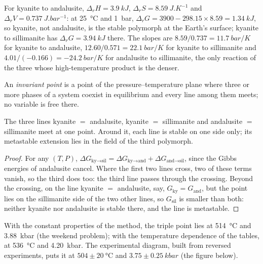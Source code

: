 For kyanite to andalusite, $\Delta_r H = \qty{3.9}{kJ}$, $\Delta_r S =
\qty{8.59}{J.K^{-1}}$ and $\Delta_r V = \qty{0.737}{J.bar^{-1}}$: at \qty{25}{\celsius}
and \qty{1}{bar}, $\Delta_r G = 3900 - 298.15\times8.59 = \qty{+1.34}{kJ}$, so kyanite,
not andalusite, is the stable polymorph at the Earth's surface; kyanite to sillimanite has
$\Delta_r G = \qty{+3.94}{kJ}$ there. The slopes are $8.59/0.737 = \qty{11.7}{bar/K}$ for
kyanite to andalusite, $12.60/0.571 = \qty{22.1}{bar/K}$ for kyanite to sillimanite and
$4.01/(-0.166) = \qty{-24.2}{bar/K}$ for andalusite to sillimanite, the only reaction of
the three whose high-temperature product is the denser.

\begin{definition}\label{def:b2:metamorphic-facies:invariant}
An \emph{invariant point} is a point of the
pressure--temperature plane where three or more phases of a system coexist in
equilibrium and every  line among them meets; no variable is free there.
\end{definition}

\begin{proposition}\label{prop:b2:metamorphic-facies:triple}
The three lines kyanite $=$ andalusite, kyanite $=$ sillimanite and andalusite $=$
sillimanite meet at one point. Around it, each line is stable on one side only; its
metastable extension lies in the field of the third polymorph.
\end{proposition}

\begin{proof}
For any $(T, P)$, $\Delta G_{\text{ky}\to\text{sil}} = \Delta G_{\text{ky}\to\text{and}} +
\Delta G_{\text{and}\to\text{sil}}$, since the Gibbs energies of andalusite cancel. Where
the first two lines cross, two of these terms vanish, so the third does too: the third
line passes through the crossing. Beyond the crossing, on the line kyanite $=$ andalusite,
say, $G_{\text{ky}} = G_{\text{and}}$, but the point lies on the sillimanite side of the
two other lines, so $G_{\text{sil}}$ is smaller than both: neither kyanite nor andalusite
is stable there, and the line is metastable.
\end{proof}

With the constant properties of the method, the triple point lies at
\qty{514}{\celsius} and \qty{3.88}{kbar} (the weekend problem); with the temperature
dependence of the tables, at \qty{536}{\celsius} and \qty{4.20}{kbar}. The experimental
diagram, built from reversed experiments, puts it at $504 \pm \qty{20}{\celsius}$ and
$3.75 \pm \qty{0.25}{kbar}$ (the figure below).

